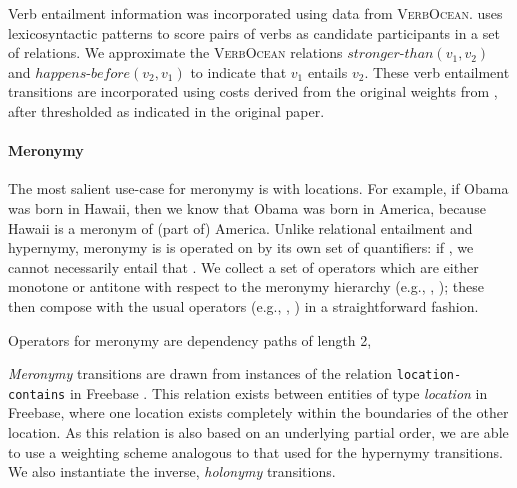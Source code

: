 Verb entailment information was incorporated using data from \textsc{VerbOcean}.
 uses lexicosyntactic patterns to score pairs of verbs as candidate participants in a set of relations.
We approximate the \textsc{VerbOcean} relations $\mathit{stronger\text{-}than}(v_1,v_2)$ and $\mathit{happens\text{-}before}(v_2,v_1)$ to indicate that $v_1$ entails $v_2$.
These verb entailment transitions are incorporated using costs derived from the original weights from , after thresholded as indicated in the original paper. 

\paragraph{Meronymy}
The most salient use-case for meronymy is with locations.
For example, if Obama was born in Hawaii, then we know that Obama was born in
  America, because Hawaii is a meronym of (part of) America.
Unlike relational entailment and hypernymy, meronymy is is operated on by its own
  set of quantifiers:
  if , we cannot necessarily entail that .
We collect a set of operators which are either monotone or antitone with respect
  to the meronymy hierarchy (e.g., , ); 
  these then compose with the usual operators (e.g., , ) in a
  straightforward fashion.

  Operators for meronymy are dependency paths of length 2, 

\textit{Meronymy} transitions are drawn from instances of the relation \texttt{location-contains} in Freebase \cite{key:2008bollacker-freebase}.
This relation exists between entities of type \textit{location} in Freebase, where one location exists completely within the boundaries of the other location.
As this relation is also based on an underlying partial order, we are able to use a weighting scheme analogous to that used for the hypernymy transitions.
We also instantiate the inverse, \textit{holonymy} transitions.


